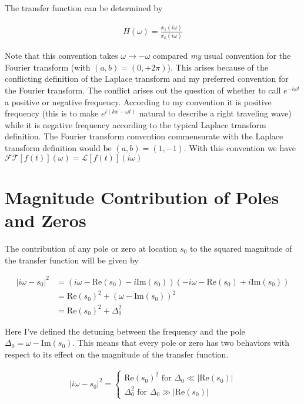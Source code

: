 \documentclass[12pt]{article}
\begin{document}
The transfer function can be determined by

\begin{align}
H(\omega) = \frac{x_1(i\omega)}{x_0(i\omega)}
\end{align}

Note that this convention takes $\omega \rightarrow -\omega$ compared \textit{my} usual convention for the Fourier transform (with $(a,b) = (0,+2\pi)$). This arises because of the conflicting definition of the Laplace transform and my preferred convention for the Fourier transform. The conflict arises out the question of whether to call $e^{-i\omega t}$ a positive or negative frequency. According to my convention it is positive frequency (this is to make $e^{i(kx-\omega t)}$ natural to describe a right traveling wave) while it is negative frequency according to the typical Laplace transform definition. The Fourier transform convention commensurate with the Laplace transform definition would be $(a,b) = (1,-1)$. With this convention we have $\mathcal{FT}[f(t)](\omega) = \mathcal{L}[f(t)](i\omega)$

\section{Magnitude Contribution of Poles and Zeros}

The contribution of any pole or zero at location $s_0$ to the squared magnitude of the transfer function will be given by

\begin{align}
|i\omega - s_0|^2 &= (i\omega - \text{Re}(s_0) - i \text{Im}(s_0))(-i\omega - \text{Re}(s_0) + i \text{Im}(s_0))\\
&= \text{Re}(s_0)^2 + (\omega - \text{Im}(s_0))^2\\
&= \text{Re}(s_0)^2 + \Delta_0^2
\end{align}

Here I've defined the detuning between the frequency and the pole $\Delta_0=\omega - \text{Im}(s_0)$.
This means that every pole or zero has two behaviors with respect to its effect on the magnitude of the transfer function.

\begin{align}
|i \omega - s_0|^2 = 
\begin{cases}
\text{Re}(s_0)^2 \text{ for } \Delta_0 \ll |\text{Re}(s_0)|\\
\Delta_0^2 \text{ for } \Delta_0 \gg |\text{Re}(s_0)|
\end{cases}
\end{align}
\end{document}

